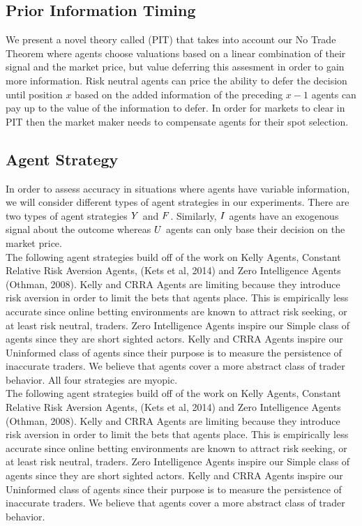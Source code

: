 \subsection{Prior Information Timing}
We present a novel theory called  (PIT) that takes into account our No Trade
Theorem where agents choose valuations based on a linear combination of their signal and the market
price, but value deferring this assesment in order to gain more information. Risk neutral agents can
price the ability to defer the decision until position $x$ based on the added information of the 
preceding $x-1$ agents can pay up to the value of the information to defer. In order for markets
to clear in PIT then the market maker needs to compensate agents for their spot selection.\\

\subsection{Agent Strategy}
In order to assess accuracy in situations where agents have variable information, we will consider different types of agent strategies in our experiments. There are two types of agent strategies  $Y$ and  $F$. Similarly,  $I$ agents have an exogenous signal about the outcome whereas  $U$ agents can only base their decision on the market price. \\

The following agent strategies build off of the work on Kelly Agents, Constant Relative Risk Aversion Agents, (Kets et al, 2014) and Zero Intelligence Agents (Othman, 2008). Kelly and CRRA Agents are limiting because they introduce risk aversion in order to limit the bets that agents place. This is empirically less accurate since online betting environments are known to attract risk seeking, or at least risk neutral, traders. Zero Intelligence Agents inspire our Simple class of agents since they are short sighted actors. Kelly and CRRA Agents inspire our Uninformed class of agents since their purpose is to measure the persistence of inaccurate traders. We believe that  agents cover a more abstract class of trader behavior. All four strategies are myopic.\\

The following agent strategies build off of the work on Kelly Agents, Constant Relative Risk Aversion Agents, (Kets et al, 2014) and Zero Intelligence Agents (Othman, 2008). Kelly and CRRA Agents are limiting because they introduce risk aversion in order to limit the bets that agents place. This is empirically less accurate since online betting environments are known to attract risk seeking, or at least risk neutral, traders. Zero Intelligence Agents inspire our Simple class of agents since they are short sighted actors. Kelly and CRRA Agents inspire our Uninformed class of agents since their purpose is to measure the persistence of inaccurate traders. We believe that  agents cover a more abstract class of trader behavior.\\

